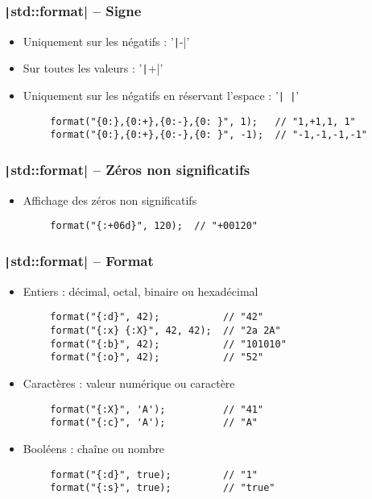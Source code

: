 \documentclass[C++.tex]{subfiles}
\begin{document}
\begin{frame}[fragile]
	\frametitle{\texttt|std::format| -- Signe}
	\begin{itemize}
		\item Uniquement sur les négatifs : '\texttt|-|'
		\item Sur toutes les valeurs : '\texttt|+|'
		\item Uniquement sur les négatifs en réservant l'espace : '\texttt{| |}'
	\end{itemize}

	\begin{verbatim}
		format("{0:},{0:+},{0:-},{0: }", 1);   // "1,+1,1, 1"
		format("{0:},{0:+},{0:-},{0: }", -1);  // "-1,-1,-1,-1"
	\end{verbatim}
\end{frame}

\begin{frame}[fragile]
	\frametitle{\texttt|std::format| -- Zéros non significatifs}
	\begin{itemize}
		\item Affichage des zéros non significatifs
	\end{itemize}

	\begin{verbatim}
		format("{:+06d}", 120);  // "+00120"
	\end{verbatim}
\end{frame}

\begin{frame}[fragile]
	\frametitle{\texttt|std::format| -- Format}
	\begin{itemize}
		\item Entiers : décimal, octal, binaire ou hexadécimal
	\end{itemize}

	\begin{verbatim}
		format("{:d}", 42);           // "42"
		format("{:x} {:X}", 42, 42);  // "2a 2A"
		format("{:b}", 42);           // "101010"
		format("{:o}", 42);           // "52"
	\end{verbatim}

	\begin{itemize}
		\item Caractères : valeur numérique ou caractère
	\end{itemize}

	\begin{verbatim}
		format("{:X}", 'A');          // "41"
		format("{:c}", 'A');          // "A"
	\end{verbatim}

	\begin{itemize}
		\item Booléens : chaîne ou nombre
	\end{itemize}

	\begin{verbatim}
		format("{:d}", true);         // "1"
		format("{:s}", true);         // "true"
	\end{verbatim}
\end{frame}
\end{document}
